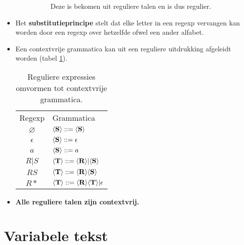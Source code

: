 \begin{itemize}
\begin{itemize}
\begin{itemize}
\begin{enumerate}
                Deze is bekomen uit reguliere talen en is dus regulier.
            \end{enumerate}
        \end{itemize}
    \end{itemize}
    \item Het \textbf{substitutieprincipe} stelt dat elke letter in een regexp vervangen kan worden door een regexp over hetzelfde ofwel een ander alfabet.
    \item Een contextvrije grammatica kan uit een reguliere uitdrukking afgeleidt worden (tabel \ref{table:regtocontext}).
        \begin{table}[ht]
            \centering
            \begin{tabular}{c l}
                Regexp & Grammatica \\
                $\varnothing$ & $\langle \textbf{S} \rangle ::= \langle \textbf{S} \rangle$ \\
                $\epsilon$ & $\langle \textbf{S} \rangle ::= \epsilon$\\
                $a$ & $\langle \textbf{S} \rangle ::= a$ \\
                $R|S$ & $\langle \textbf{T} \rangle ::= \langle \textbf{R} \rangle|\langle \textbf{S} \rangle$ \\
                $RS$ & $\langle \textbf{T} \rangle ::= \langle \textbf{R} \rangle\langle \textbf{S} \rangle$\\
                $R*$ & $\langle \textbf{T} \rangle ::= \langle \textbf{R} \rangle\langle \textbf{T} \rangle|\epsilon$
            \end{tabular}
            \caption{Reguliere expressies omvormen tot contextvrije grammatica.}
            \label{table:regtocontext}
        \end{table}
    \item \textbf{Alle reguliere talen zijn contextvrij.}
\end{itemize}




\section{Variabele tekst}

